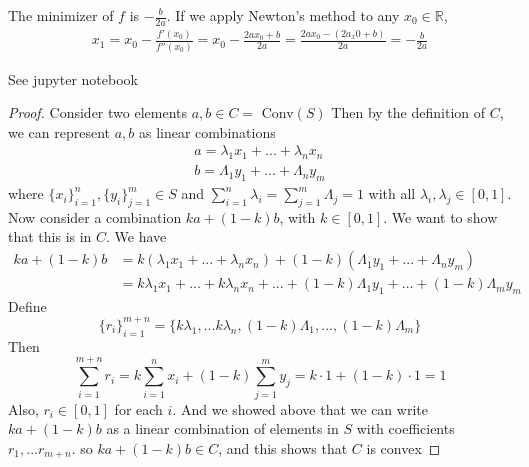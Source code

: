 \documentclass[12pt]{article}
\newenvironment{problem}[2][Problem]{\begin{trivlist}
\item[\hskip \labelsep {\bfseries #1}\hskip \labelsep {\bfseries #2.}]}{\end{trivlist}}
\theoremstyle{definition}
\theoremstyle{definition}
\theoremstyle{definition}
\theoremstyle{definition}
\begin{document}
\begin{problem}{6.11}
The minimizer of $f$ is $-\frac{b}{2a}$. If we apply Newton's method to any $x_0 \in \mathbb{R}$, 
\begin{align*}
x_1 = x_0 - \frac{f'(x_0)}{f''(x_0)} = x_0 - \frac{2ax_0+b}{2a} = \frac{2ax_0 - (2a_x0 +b)}{2a}= -\frac{b}{2a}
\end{align*}
\end{problem}

\begin{problem}{6.15}
See jupyter notebook
\end{problem}

\begin{problem}{7.1}
\begin{proof}
Consider two elements $a, b \in C =$ Conv$(S)$ Then by the definition of $C$, we can represent $a, b$ as linear combinations \begin{align*}
a = \lambda_1 x_1 + ... + \lambda_n x_n \\
b = \Lambda_1 y_1 + ... + \Lambda_n y_m  
\end{align*}
where $\{ x_i \}_{i=1}^n, \{ y_i \}_{j=1}^m \in S$ and $\sum_{i=1}^n \lambda_i = \sum_{j=1}^m \Lambda_j = 1$ with all $\lambda_i, \lambda_j \in [0,1]$. \\
Now consider a combination $ka + (1-k)b$, with $k\in[0,1]$. We want to show that this is in $C$. We have 
\begin{align*}
ka + (1-k)b &= k(\lambda_1 x_1 + ... + \lambda_n x_n) + (1-k)(\Lambda_1 y_1 + ... + \Lambda_n y_m)\\
&= k\lambda_1 x_1 +... + k\lambda_n x_n + ... + (1-k) \Lambda_1 y_1 + ... + (1-k) \Lambda_m y_m
\end{align*}
Define $$\{ r_i \}_{i=1}^{m+n} = \{ k\lambda_1, ... k\lambda_n, (1-k)\Lambda_1, ... , (1-k)\Lambda_m \} $$
Then $$\sum_{i=1}^{m+n} r_i = k \sum_{i=1}^n x_i + (1-k) \sum_{j=1}^m y_j = k \cdot 1 + (1-k) \cdot 1 = 1$$ 
Also, $r_i \in [0, 1]$ for each $i$. And we showed above that we can write $ka + (1-k)b$ as a linear combination of elements in $S$ with coefficients $r_1, ... r_{m+n}$. so $ka + (1-k)b \in C$, and this shows that $C$ is convex 
\end{proof}
\end{problem}
\end{document}
